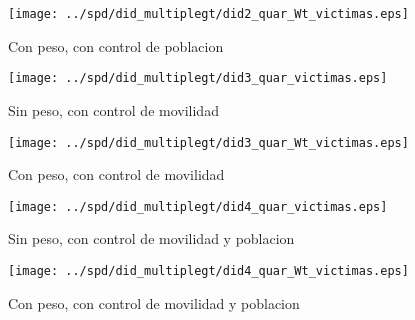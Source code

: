 \documentclass[11pt,letterpaper]{article}
\begin{document}
\begin{figure}[hbtp]
\caption{Con peso, con control de poblacion}
\centering
\texttt{[image: ../spd/did\_multiplegt/did2\_quar\_Wt\_victimas.eps]}
\end{figure}
\begin{figure}[hbtp]
\caption{Sin peso, con control de movilidad}
\centering
\texttt{[image: ../spd/did\_multiplegt/did3\_quar\_victimas.eps]}
\end{figure}

\begin{figure}[hbtp]
\caption{Con peso, con control de movilidad}
\centering
\texttt{[image: ../spd/did\_multiplegt/did3\_quar\_Wt\_victimas.eps]}
\end{figure}
\begin{figure}[hbtp]
\caption{Sin peso, con control de movilidad y poblacion}
\centering
\texttt{[image: ../spd/did\_multiplegt/did4\_quar\_victimas.eps]}
\end{figure}

\begin{figure}[hbtp]
\caption{Con peso, con control de movilidad y poblacion}
\centering
\texttt{[image: ../spd/did\_multiplegt/did4\_quar\_Wt\_victimas.eps]}
\end{figure}
\end{document}
